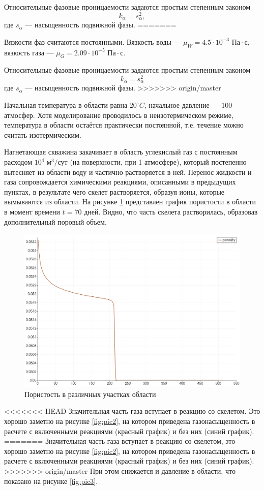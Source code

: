 \documentclass[14pt,a4paper]{extarticle}
\begin{document}
Относительные фазовые проницаемости задаются простым степенным законом $$k_{\alpha} = s_{\alpha}^2,$$ где $s_{\alpha}$ --- насыщенность подвижной фазы.
=======

Вязкости фаз считаются постоянными. Вязкость воды --- ${\mu}_W = 4.5 \cdot 10^{-3} \text{ Па} \cdot \text{с}$, вязкость газа --- $\mu_G = 2.09\cdot 10^{-5} \text{ Па} \cdot \text{с}$.

Относительные фазовые проницаемости задаются простым степенным законом $$k_{\alpha} = s_{\alpha}^2$$ где $s_{\alpha}$ --- насыщенность подвижной фазы.
>>>>>>> origin/master

Начальная температура в области равна $20^\circ C$, начальное давление --- $100$ атмосфер. Хотя моделирование проводилось в неизотермическом режиме, температура в области остаётся практически постоянной, т.е. течение можно считать изотермическим.

Нагнетающая скважина закачивает в область углекислый газ с постоянным расходом $10^4 \text{ м}^3/\text{сут}$ (на поверхности, при 1 атмосфере), который постепенно вытесняет из области воду и частично растворяется в ней. Перенос жидкости и газа сопровождается химическими реакциями, описанными в предыдущих пунктах, в результате чего скелет растворяется, образуя ионы, которые вымываются из области. На рисунке \ref{fig:pic1} представлен график пористости в области в момент времени $t = 70\text{ дней}$. Видно, что часть скелета растворилась, образовав дополнительный поровый объем.

\begin{figure}[h!]
\centering
\includegraphics[width=.75\textwidth]{porosity}
\caption{Пористость в различных участках области} \label{fig:pic1}
\end{figure}

<<<<<<< HEAD
Значительная часть газа вступает в реакцию со скелетом. Это хорошо заметно на рисунке \ref{fig:pic2}, на котором приведена газонасыщенность в расчете с включенными реакциями (красный график) и без них (синий график).
=======
Значительная часть газа вступает в реакцию со скелетом, это хорошо заметно на рисунке \ref{fig:pic2}, на котором приведена газонасыщенность в расчете с включенными реакциями (красный график) и без них (синий график).
>>>>>>> origin/master
При этом снижается и давление в области, что показано на рисунке \ref{fig:pic3}.
\end{document}
